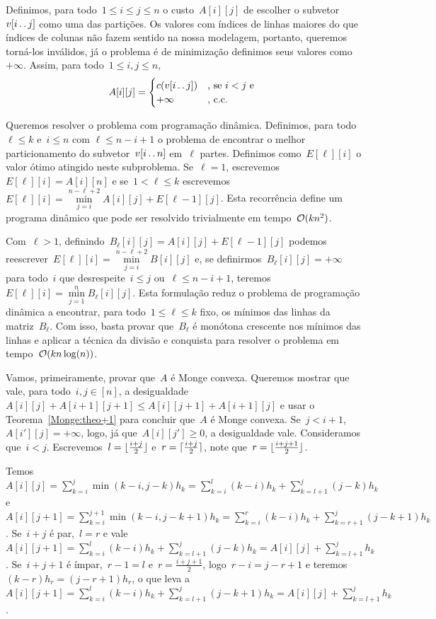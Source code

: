 Definimos, para todo~$1 \leq i \leq j \leq n$ o custo~$A[i][j]$ de escolher o subvetor~$v[i \,.\,.\, j]$ como uma das partições. Os valores com índices de linhas maiores do que índices de colunas não fazem sentido na nossa modelagem, portanto, queremos torná-los inválidos, já o problema é de minimização definimos seus valores como~$+\infty$. Assim, para todo~$1 \leq i,j \leq n$,
\begin{equation*}
A[i][j] = \begin{cases}
    c(v[i \,.\,.\, j]) & \text{, se } i < j \text{ e }\\
    +\infty          & \text{, c.c.}
\end{cases}
\end{equation*}

Queremos resolver o problema com programação dinâmica. Definimos, para todo~$\ell \leq k$ e~$i \leq n$ com $\ell \leq n - i + 1$ o problema de encontrar o melhor particionamento do subvetor~$v[i \,.\,.\, n]$ em~$\ell$ partes. Definimos como~$E[\ell][i]$ o valor ótimo atingido neste subproblema. Se~$\ell = 1$, escrevemos~$E[\ell][i] = A[i][n]$ e se~$1 < \ell \leq k$ escrevemos~$E[\ell][i] = \min \limits_{j=i}^{n-\ell+2} A[i][j] + E[\ell-1][j]$. Esta recorrência define um programa dinâmico que pode ser resolvido trivialmente em tempo~$\mathcal{O}(kn^2)$.

Com~$\ell > 1$, definindo~$B_\ell[i][j] = A[i][j] + E[\ell-1][j]$ podemos reescrever~$E[\ell][i] = \min \limits_{j=i}^{n-\ell+2} B[i][j]$ e, se definirmos~$B_\ell[i][j] = +\infty$ para todo~$i$ que desrespeite~$i \leq j$ ou~$\ell \leq n - i + 1$, teremos~$E[\ell][i] = \min \limits_{j=1}^{n} B_\ell[i][j]$. Esta formulação reduz o problema de programação dinâmica a encontrar, para todo~$1 \leq \ell \leq k$ fixo, os mínimos das linhas da matriz~$B_\ell$. Com isso, basta provar que~$B_\ell$ é monótona crescente nos mínimos das linhas e aplicar a técnica da divisão e conquista para resolver o problema em tempo~$\mathcal{O}(kn\log(n))$.

Vamos, primeiramente, provar que~$A$ é Monge convexa. Queremos mostrar que vale, para todo~$i,j \in [n]$, a desigualdade~${A[i][j] + A[i+1][j+1] \leq A[i][j+1] + A[i+1][j]}$ e usar o Teorema~\ref{Monge:theo+1} para concluir que~$A$ é Monge convexa. Se~$j < i + 1$, $A[i'][j] = +\infty$, logo, já que~$A[i][j'] \geq 0$, a desigualdade vale. Consideramos que~$i < j$. Escrevemos~$l = \lfloor\frac{i+j}{2}\rfloor$ e~$r = \lceil\frac{i+j}{2}\rceil$, note que~$r = \lfloor\frac{i+j+1}{2}\rfloor$.  

Temos~$A[i][j] = \sum\limits_{k=i}^j \min(k-i,j-k)h_k = {\sum\limits_{k=i}^l (k-i) h_k + \sum\limits_{k=l+1}^j (j-k) h_k}$ e~$A[i][j+1] = \sum\limits_{k=i}^{j+1} \min(k-i,j-k+1)h_k = {\sum\limits_{k=i}^r (k-i)h_k + \sum\limits_{k=r+1}^j (j-k+1)h_k}$. Se~$i+j$ é par,~$l=r$ e vale~$A[i][j+1] = {\sum\limits_{k=i}^l (k-i)h_k + \sum\limits_{k=l+1}^j (j-k)h_k} = {A[i][j] + \sum\limits_{k=l+1}^j h_k}$. Se~$i+j+1$ é ímpar,~$r-1=l$ e~$r=\frac{i+j+1}{2}$, logo~$r-i = j-r+1$ e teremos~$(k-r)h_r = (j-r+1)h_r$, o que leva a~$A[i][j+1] = {\sum_{k=i}^l (k-i)h_k + \sum_{k=l+1}^j (j-k+1)h_k} = {A[i][j] + \sum\limits_{k=l+1}^j h_k}$.  

